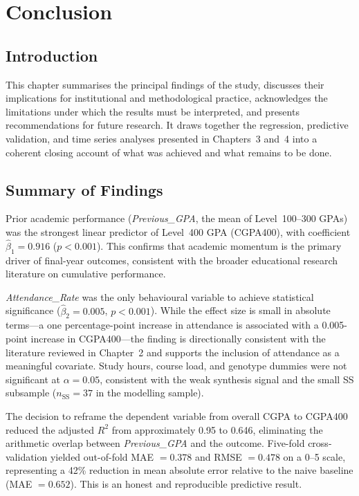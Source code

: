 \documentclass[12pt]{report}
\begin{document}
	\chapter{Conclusion}
	
	\section{Introduction}
	This chapter summarises the principal findings of the study, discusses their implications for institutional and methodological practice, acknowledges the limitations under which the results must be interpreted, and presents recommendations for future research. It draws together the regression, predictive validation, and time series analyses presented in Chapters~3 and~4 into a coherent closing account of what was achieved and what remains to be done.
	
	\section{Summary of Findings}
	Prior academic performance (\textit{Previous\_GPA}, the mean of Level~100--300 GPAs) was the strongest linear predictor of Level~400 GPA (CGPA400), with coefficient $\hat{\beta}_1 = 0.916$ ($p < 0.001$). This confirms that academic momentum is the primary driver of final-year outcomes, consistent with the broader educational research literature on cumulative performance.
	
	\textit{Attendance\_Rate} was the only behavioural variable to achieve statistical significance ($\hat{\beta}_2 = 0.005$, $p < 0.001$). While the effect size is small in absolute terms---a one percentage-point increase in attendance is associated with a 0.005-point increase in CGPA400---the finding is directionally consistent with the literature reviewed in Chapter~2 and supports the inclusion of attendance as a meaningful covariate. Study hours, course load, and genotype dummies were not significant at $\alpha = 0.05$, consistent with the weak synthesis signal and the small SS subsample ($n_{\text{SS}} = 37$ in the modelling sample).
	
	The decision to reframe the dependent variable from overall CGPA to CGPA400 reduced the adjusted $R^2$ from approximately 0.95 to 0.646, eliminating the arithmetic overlap between \textit{Previous\_GPA} and the outcome. Five-fold cross-validation yielded out-of-fold MAE $= 0.378$ and RMSE $= 0.478$ on a 0--5 scale, representing a 42\% reduction in mean absolute error relative to the naive baseline (MAE $= 0.652$). This is an honest and reproducible predictive result.
	
\end{document}
